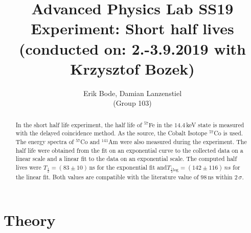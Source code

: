 \documentclass[30pt,a4paper]{article}
\title{
	\large Advanced Physics Lab	SS19 \\[4mm]
	\textbf{\LARGE Experiment: Short half lives
	} \\[4mm]
	(conducted on: 2.-3.9.2019 with Krzysztof Bozek) \\}
\author{Erik Bode, Damian Lanzenstiel \\ (Group 103)}
\begin{document}
	
	\begin{titlepage}
	\maketitle
	\vspace{2cm}
	\begin{abstract}
	In the short half life experiment, the half life of $^{57}$Fe in the $14.4$\,keV state is measured with the delayed coincidence method. As the source, the Cobalt Isotope $^{57}$Co is used. The energy spectra of $^{57}$Co and ${^141}$Am were also measured during the experiment. The half life were obtained from the fit on an exponential curve to the collected data on a linear scale and a linear fit to the data on an exponential scale. The computed half lives were $T_\frac{1}{2}=(83\pm10)$\,ns for the exponential fit and$T_{\frac{1}{2} \textrm{log}} = (142\pm116)\,ns$ for the linear fit. Both values are compatible with the literature value of $98\,$ns within $2\,\sigma$.
	\end{abstract}
	\end{titlepage}
	\newpage
	
	\tableofcontents
	\newpage
	
	\section{Theory}
\end{document}

